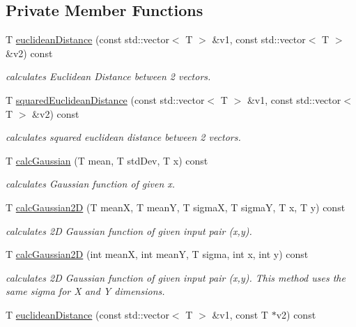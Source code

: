 \subsection*{Private Member Functions}
\begin{DoxyCompactItemize}
\item 
T \mbox{\hyperlink{class_s_o_m_a81a8ee36536002796b31d03f9a67ded1}{euclidean\+Distance}} (const std\+::vector$<$ T $>$ \&v1, const std\+::vector$<$ T $>$ \&v2) const
\begin{DoxyCompactList}\small\item\em calculates Euclidean Distance between 2 vectors. \end{DoxyCompactList}\item 
T \mbox{\hyperlink{class_s_o_m_ad57639354c1d0d50222691e05f328fb5}{squared\+Euclidean\+Distance}} (const std\+::vector$<$ T $>$ \&v1, const std\+::vector$<$ T $>$ \&v2) const
\begin{DoxyCompactList}\small\item\em calculates squared euclidean distance between 2 vectors. \end{DoxyCompactList}\item 
T \mbox{\hyperlink{class_s_o_m_a1cc6e3ecbbf41df75f3603fd0fa8fb86}{calc\+Gaussian}} (T mean, T std\+Dev, T x) const
\begin{DoxyCompactList}\small\item\em calculates Gaussian function of given x. \end{DoxyCompactList}\item 
T \mbox{\hyperlink{class_s_o_m_aa61653cc314a75b7315951c27ec2bc2a}{calc\+Gaussian2D}} (T meanX, T meanY, T sigmaX, T sigmaY, T x, T y) const
\begin{DoxyCompactList}\small\item\em calculates 2D Gaussian function of given input pair (x,y). \end{DoxyCompactList}\item 
T \mbox{\hyperlink{class_s_o_m_a3a34e3e6e83577c1afa7b27dee2ab544}{calc\+Gaussian2D}} (int meanX, int meanY, T sigma, int x, int y) const
\begin{DoxyCompactList}\small\item\em calculates 2D Gaussian function of given input pair (x,y). This method uses the same sigma for X and Y dimensions. \end{DoxyCompactList}\item 
T \mbox{\hyperlink{class_s_o_m_a1bdfadf3e4dbd2a9cb229e72cf52fb0b}{euclidean\+Distance}} (const std\+::vector$<$ T $>$ \&v1, const T $\ast$v2) const

\end{DoxyCompactItemize}
